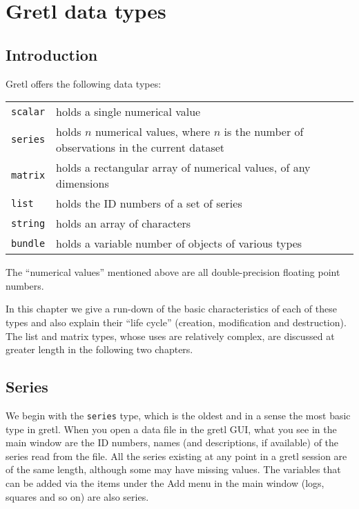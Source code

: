 \chapter{Gretl data types}
\label{chap:datatypes}

\section{Introduction}

Gretl offers the following data types:
%
\begin{center}
\begin{tabular}{lp{}}
\texttt{scalar} & holds a single numerical value\\
\texttt{series} & holds $n$ numerical values, where $n$
 is the number of observations in the current dataset \\
\texttt{matrix} & holds a rectangular array of numerical
 values, of any dimensions\\
\texttt{list} & holds the ID numbers of a set of series \\
\texttt{string} & holds an array of characters\\
\texttt{bundle} & holds a variable number of objects of 
 various types
\end{tabular}
\end{center}

The ``numerical values'' mentioned above are all double-precision
floating point numbers.

In this chapter we give a run-down of the basic characteristics of
each of these types and also explain their ``life cycle'' (creation,
modification and destruction). The list and matrix types, whose uses
are relatively complex, are discussed at greater length in the
following two chapters. 

\section{Series}
\label{sec:Series}

We begin with the \texttt{series} type, which is the oldest and in a
sense the most basic type in gretl. When you open a data file in the
gretl GUI, what you see in the main window are the ID numbers, names
(and descriptions, if available) of the series read from the file. All
the series existing at any point in a gretl session are of the same
length, although some may have missing values. The variables that can
be added via the items under the \textsf{Add} menu in the main window
(logs, squares and so on) are also series.

